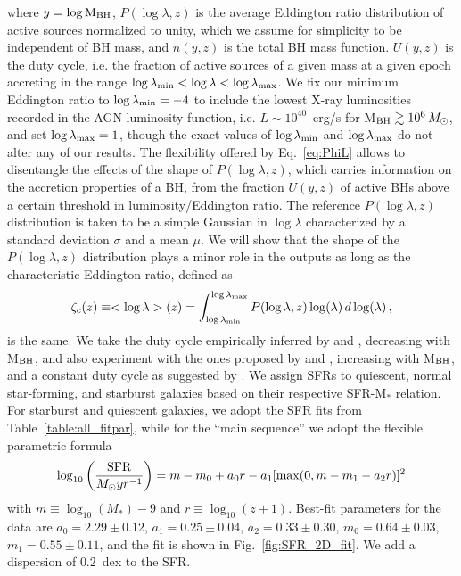 where $y=\log {\rm M}_{\rm BH}$, $P(\log \lambda,z)$ is the average Eddington ratio distribution of active sources normalized to unity, which we assume for simplicity to be independent of BH mass, and $n(y,z)$ is the total BH mass function. $U(y,z)$ is the duty cycle, i.e. the fraction of active sources of a given mass at a given epoch accreting in the range $\log \lambda_{\rm min}<\log \lambda<\log \lambda_{\rm max}$. We fix our minimum Eddington ratio to $\log \lambda_{\rm min}=-4$ to include the lowest X-ray luminosities recorded in the AGN luminosity function, i.e. $L\sim 10^{40}\,$ erg/s for M$_{\rm BH}\gtrsim 10^6 \, M_{\odot}$, and set $\log \lambda_{\rm max}=1$, though the exact values of $\log \lambda_{\rm min}$ and $\log \lambda_{\rm max}$ do not alter any of our results. The flexibility offered by Eq.~\ref{eq:PhiL} allows to disentangle the effects of the shape of $P(\log \lambda,z)$, which carries information on the accretion properties of a BH, from the fraction $U(y,z)$ of active BHs above a certain threshold in luminosity/Eddington ratio. The reference $P(\log \lambda,z)$ distribution is taken to be a simple Gaussian in $\log \lambda$ characterized by a standard deviation $\sigma$ and a mean $\mu$. We will show that the shape of the $P(\log \lambda,z)$ distribution plays a minor role in the outputs as long as the characteristic Eddington ratio, defined as
\begin{equation}
\zeta_c(z)\equiv<\log \lambda>(z)=\int_{\log\lambda_{\rm min}}^{\log \lambda_{\rm max}} P(\log\lambda,z)\log(\lambda) \,d\log(\lambda)\, ,
\end{equation}
is the same.
We take the duty cycle empirically inferred by \citet{2010A&A...516A..87S} and \citet{2015MNRAS.447.2085S}, decreasing with M$_{\rm BH}$, and also experiment with the ones proposed by \citet{2019MNRAS.488...89M} and \citet{2017MNRAS.471.1976G}, increasing with M$_{\rm BH}$, and a constant duty cycle as suggested by \citet{goulding10}. 
We assign SFRs to quiescent, normal star-forming, and starburst galaxies based on their respective SFR-M$_*$ relation.
For starburst and quiescent galaxies, we adopt the SFR fits from Table~\ref{table:all_fitpar}, while for the ``main sequence'' we adopt the 
\citet[Eq.~9]{2015A&A...575A..74S} flexible parametric formula
\begin{equation}
    \log_{10}\left(\frac{\rm SFR}{M_\odot yr^{-1}}\right)= m - m_0 +a_0 r - a_1[\max(0,m-m_1-a_2r)]^2
	\label{eq:SFR}
\end{equation}
with $m\equiv\log_{10}(M_*)-9$ and $r\equiv\log_{10}(z+1)$. Best-fit parameters for the data are $a_0=2.29\pm 0.12$, $a_1=0.25 \pm 0.04$, $a_2=0.33 \pm 0.30$, $m_0=0.64 \pm 0.03$, $m_1=0.55\pm 0.11$, and the fit is shown in Fig.~\ref{fig:SFR_2D_fit}. We add a dispersion of $0.2$~dex to the SFR. 

